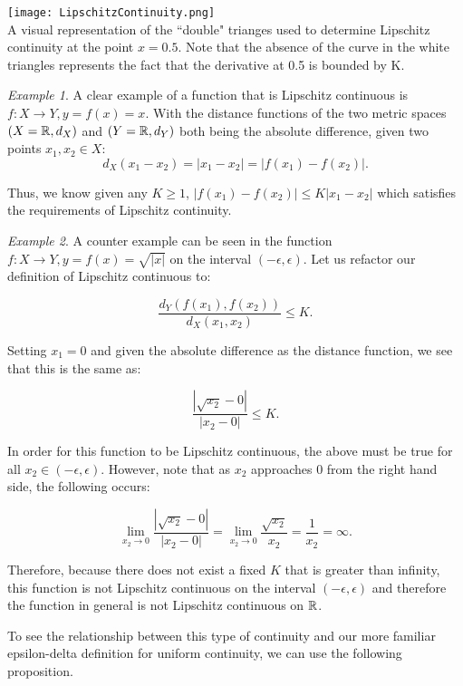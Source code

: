 \documentclass{article}
\theoremstyle{remark}
\newtheorem{example}{Example}
\begin{document}
\begin{center}\texttt{[image: LipschitzContinuity.png]} \\ A visual representation of the ``double" trianges used to determine Lipschitz continuity at the point $x = 0.5$. Note that the absence of the curve in the white triangles represents the fact that the derivative at 0.5 is bounded by K. \end{center}
\begin{example}
A clear example of a function that is Lipschitz continuous is $f: X \to Y, y =  f(x) = x$. With the distance functions of the two metric spaces $(X = \Bbb R, d_X)$ and $(Y = \Bbb R, d_Y)$ both being the absolute difference, given two points $x_1, x_2 \in X$:
$$d_X(x_1 - x_2) = |x_1 - x_2| = |f(x_1) - f(x_2)|.$$

Thus, we know given any $K \geq 1$, $ |f(x_1) - f(x_2)| \leq K|x_1 - x_2|$ which satisfies the requirements of Lipschitz continuity.
\end{example}

\begin{example} 
A counter example can be seen in the function $f: X \to Y, y =  f(x) = \sqrt{|x|}$ on the interval $(-\epsilon, \epsilon)$. Let us refactor our definition of Lipschitz continuous to: 

$$ \frac{d_Y(f(x_1), f(x_2))}{d_X(x_1, x_2)} \leq K.$$

 Setting $x_1 = 0$ and given the absolute difference as the distance function, we see that this is the same as:

$$ \frac{|\sqrt{x_2} - 0|}{|x_2 - 0|} \leq K.$$

In order for this function to be Lipschitz continuous, the above must be true for all $x_2 \in (-\epsilon, \epsilon) $. However, note that as $x_2$ approaches 0 from the right hand side, the following occurs:

$$\lim_{x_2 \to 0}\frac{|\sqrt{x_2} - 0|}{|x_2 - 0|} = \lim_{x_2 \to 0}\frac{\sqrt{x_2}}{x_2} = \frac{1}{x_2} = \infty.$$

Therefore, because there does not exist a fixed $K$ that is greater than infinity, this function is not Lipschitz continuous on the interval $(-\epsilon, \epsilon)$ and therefore the function in general is not Lipschitz continuous on $\Bbb R$.
\end{example}


To see the relationship between this type of continuity and our more familiar epsilon-delta definition for uniform continuity, we can use the following proposition.\\
\end{document}
